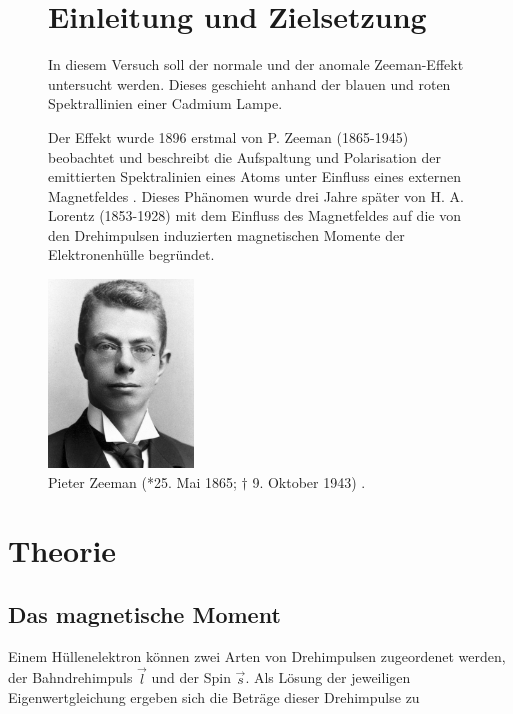 



\maketitle

\FloatBarrier
\begin{figure}[h]
\begin{minipage}[t]{0.59\textwidth}
\vspace{0pt}
\section{Einleitung und Zielsetzung}
In diesem Versuch soll der normale und der anomale Zeeman-Effekt untersucht werden. Dieses geschieht anhand der blauen und roten Spektrallinien einer Cadmium Lampe.

Der Effekt wurde 1896 erstmal von P. Zeeman (1865-1945) beobachtet und beschreibt die Aufspaltung und Polarisation der emittierten Spektralinien eines Atoms
unter Einfluss eines externen Magnetfeldes \cite{quelle03}. Dieses Phänomen wurde drei Jahre später von H. A. Lorentz (1853-1928) mit dem Einfluss des Magnetfeldes auf die
von den Drehimpulsen induzierten magnetischen Momente der Elektronenhülle begründet.
\end{minipage}
\hfill
\begin{minipage}[t]{0.4\textwidth}
\vspace{0pt}
\centering
\includegraphics[height=5.0cm]{sexyTyp.png}
\caption{Pieter Zeeman (*25. Mai 1865; $\dagger$ 9. Oktober 1943) \cite{quelle03}.}
\label{fig:tfig1}
\end{minipage}
\end{figure}
\FloatBarrier

\section{Theorie}
\subsection{Das magnetische Moment}
Einem Hüllenelektron können zwei Arten von Drehimpulsen zugeordenet werden, der Bahndrehimpuls $\vec{l}$ und der Spin $\vec{s}$. Als Lösung der jeweiligen Eigenwertgleichung
ergeben sich die Beträge dieser Drehimpulse zu

